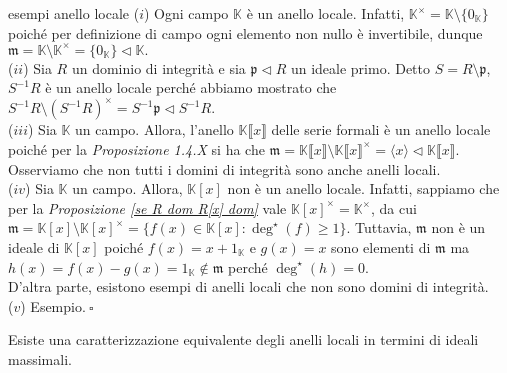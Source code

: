 \begin{example}[]{esempi anello locale}
  ($i$) Ogni campo $\mathbb{K}$ è un anello locale. Infatti, $\mathbb{K}^{\times}=\mathbb{K}\setminus \{0_{\mathbb{K}}\}$ 
  poiché per definizione di campo ogni elemento non nullo è invertibile, dunque 
  $\mathfrak{m}=\mathbb{K}\setminus\mathbb{K}^{\times}=\{0_{\mathbb{K}}\}\lhd \mathbb{K}.$\\

  \noindent ($ii$) Sia $R$ un dominio di integrità e sia $\mathfrak{p}\lhd R$ un ideale primo. Detto $S=R\setminus \mathfrak{p}$, $S^{-1}R$ 
  è un anello locale perché abbiamo mostrato che $S^{-1}R \setminus (S^{-1}R)^{\times}=S^{-1}\mathfrak{p}\lhd S^{-1}R.$\\

  \noindent ($iii$) Sia $\mathbb{K}$ un campo. Allora, l'anello $\mathbb{K}\llbracket x\rrbracket$ delle serie formali è un anello locale poiché 
  per la \emph{Proposizione 1.4.X} si ha che $\mathfrak{m}=\mathbb{K}\llbracket x\rrbracket\setminus\mathbb{K}\llbracket x\rrbracket^{\times}=\langle x 
  \rangle\lhd \mathbb{K}\llbracket x\rrbracket.$\\

  \noindent Osserviamo che non tutti i domini di integrità sono anche anelli locali.\\

  \noindent ($iv$) Sia $\mathbb{K}$ un campo. Allora, $\mathbb{K}[x]$ non è un anello locale. Infatti, sappiamo che per la 
  \emph{Proposizione \ref{se R dom R[x] dom}} vale $\mathbb{K}[x]^{\times}=\mathbb{K}^{\times}$, 
  da cui $\mathfrak{m}=\mathbb{K}[x]\setminus\mathbb{K}[x]^{\times}=\{f(x)\in \mathbb{K}[x]: \deg^{\star}(f)\geq 1\}$. 
  Tuttavia, $\mathfrak{m}$ non è un ideale di $\mathbb{K}[x]$ poiché $f(x)=x+1_{\mathbb{K}}$ e $g(x)=x$ sono elementi 
  di $\mathfrak{m}$ ma $h(x)=f(x)-g(x)=1_{\mathbb{K}}\not\in \mathfrak{m}$ perché $\deg^{\star}(h)=0.$\\

  \noindent D'altra parte, esistono esempi di anelli locali che non sono domini di integrità.\\

  \noindent ($v$) Esempio$. \ \square$
\end{example}

\noindent Esiste una caratterizzazione equivalente degli anelli locali in termini di ideali massimali.

